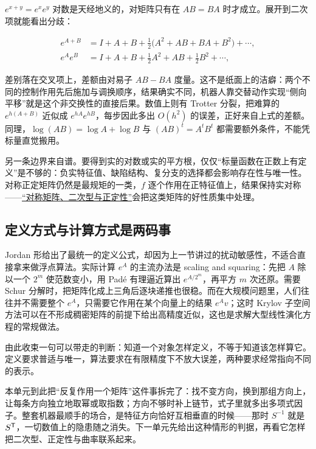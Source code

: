 \(e^{x+y}=e^xe^y\) 对数是天经地义的，对矩阵只有在 \(AB=BA\) 时才成立。展开到二次项就能看出分歧：

\[
\begin{aligned}
e^{A+B}&=I+A+B+\tfrac12\bigl(A^2+AB+BA+B^2\bigr)+\cdots,\\
e^Ae^B&=I+A+B+\tfrac12A^2+AB+\tfrac12B^2+\cdots,
\end{aligned}
\]

差别落在交叉项上，差额由对易子 \(AB-BA\) 度量。这不是纸面上的洁癖：两个不同的控制作用先后施加与调换顺序，结果确实不同，机器人靠交替动作实现``侧向平移''就是这个非交换性的直接后果。数值上则有 Trotter 分裂，把难算的 \(e^{h(A+B)}\) 近似成 \(e^{hA}e^{hB}\)，每步因此多出 \(O(h^2)\) 的误差，正好来自上式的差额。同理，\(\log(AB)=\log A+\log B\) 与 \((AB)^t=A^tB^t\) 都需要额外条件，不能凭标量直觉搬用。

另一条边界来自谱。要得到实的对数或实的平方根，仅仅``标量函数在正数上有定义''是不够的：负实特征值、缺陷结构、复分支的选择都会影响存在性与唯一性。对称正定矩阵仍然是最规矩的一类，\(f\) 逐个作用在正特征值上，结果保持实对称——\hyperref[ch:021]{``对称矩阵、二次型与正定性''}会把这类矩阵的好性质集中处理。

\subsection{定义方式与计算方式是两码事}

Jordan 形给出了最统一的定义公式，却因为上一节讲过的扰动敏感性，不适合直接拿来做浮点算法。实际计算 \(e^{A}\) 的主流办法是 scaling and squaring：先把 \(A\) 除以一个 \(2^m\) 使范数变小，用 Pad\'e 有理逼近算出 \(e^{A/2^m}\)，再平方 \(m\) 次还原。需要 Schur 分解时，把矩阵化成上三角后逐块递推也很稳。而在大规模问题里，人们往往并不需要整个 \(e^{A}\)，只需要它作用在某个向量上的结果 \(e^{A}v\)；这时 Krylov 子空间方法可以在不形成稠密矩阵的前提下给出高精度近似，这也是求解大型线性演化方程的常规做法。

由此收束一句可以带走的判断：知道一个对象怎样定义，不等于知道该怎样算它。定义要求普适与唯一，算法要求在有限精度下不放大误差，两种要求经常指向不同的表示。

本单元到此把``反复作用一个矩阵''这件事拆完了：找不变方向，换到那组方向上，让每条方向独立地取幂或取指数；方向不够时补上链节，式子里就多出多项式因子。整套机器最顺手的场合，是特征方向恰好互相垂直的时候——那时 \(S^{-1}\) 就是 \(S^{\mathsf{T}}\)，一切数值上的隐患随之消失。下一单元先给出这种情形的判据，再看它怎样把二次型、正定性与曲率联系起来。
